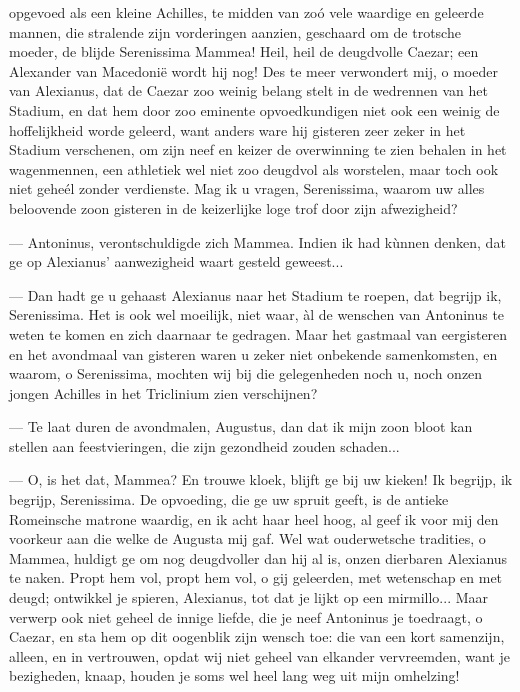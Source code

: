 \documentclass[a4paper, 12pt, oneside, dutch]{article}
\begin{document}
opgevoed als een kleine Achilles, te midden van zoó vele waardige en geleerde mannen, die stralende zijn vorderingen aanzien, geschaard om de trotsche moeder, de blijde Serenissima Mammea! Heil, heil de deugdvolle Caezar; een Alexander van Macedonië wordt hij nog! Des te meer verwondert mij, o moeder van Alexianus, dat de Caezar zoo weinig belang stelt in de wedrennen van het Stadium, en dat hem door zoo eminente opvoedkundigen niet ook een weinig de hoffelijkheid worde geleerd, want anders ware hij gisteren zeer zeker in het Stadium verschenen, om zijn neef en keizer de overwinning te zien behalen in het wagenmennen, een athletiek wel niet zoo deugdvol als worstelen, maar toch ook niet geheél zonder verdienste. Mag ik u vragen, Serenissima, waarom uw alles beloovende zoon gisteren in de keizerlijke loge trof door zijn afwezigheid?

--- Antoninus, verontschuldigde zich Mammea. Indien ik had kùnnen denken, dat ge op Alexianus' aanwezigheid waart gesteld geweest...

--- Dan hadt ge u gehaast Alexianus naar het Stadium te roepen, dat begrijp ik, Serenissima. Het is ook wel moeilijk, niet waar, àl de wenschen van Antoninus te weten te komen en zich daarnaar te gedragen. Maar het gastmaal van eergisteren en het avondmaal van gisteren waren u zeker niet onbekende samenkomsten, en waarom, o Serenissima, mochten wij bij die gelegenheden noch u, noch onzen jongen Achilles in het Triclinium zien verschijnen?

--- Te laat duren de avondmalen, Augustus, dan dat ik mijn zoon bloot kan stellen aan feestvieringen, die zijn gezondheid zouden schaden...

--- O, is het dat, Mammea? En trouwe kloek, blijft ge bij uw kieken! Ik begrijp, ik begrijp, Serenissima. De opvoeding, die ge uw spruit geeft, is de antieke Romeinsche matrone waardig, en ik acht haar heel hoog, al geef ik voor mij den voorkeur aan die welke de Augusta mij gaf. Wel wat ouderwetsche tradities, o Mammea, huldigt ge om nog deugdvoller dan hij al is, onzen dierbaren Alexianus te naken. Propt hem vol, propt hem vol, o gij geleerden, met wetenschap en met deugd; ontwikkel je spieren, Alexianus, tot dat je lijkt op een mirmillo... Maar verwerp ook niet geheel de innige liefde, die je neef Antoninus je toedraagt, o Caezar, en sta hem op dit oogenblik zijn wensch toe: die van een kort samenzijn, alleen, en in vertrouwen, opdat wij niet geheel van elkander vervreemden, want je bezigheden, knaap, houden je soms wel heel lang weg uit mijn omhelzing!
\end{document}
